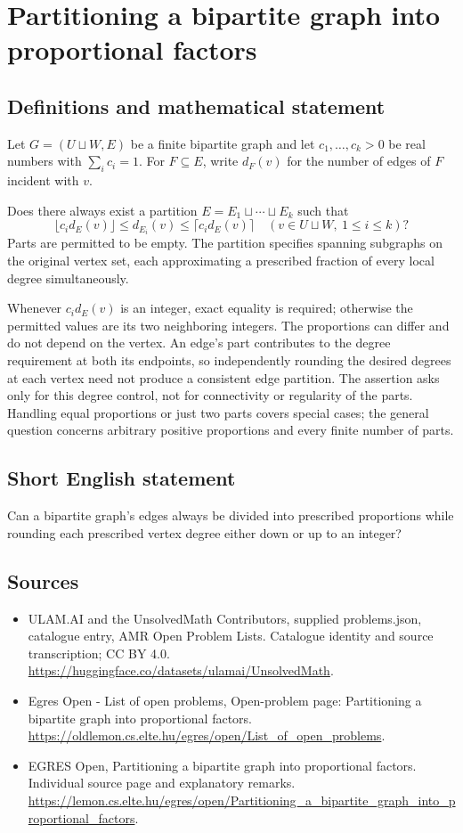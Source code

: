 \documentclass[11pt,a4paper]{article}
\begin{document}
\section*{Partitioning a bipartite graph into proportional factors}\label{statement}

\subsection{Definitions and mathematical statement}
Let $G=(U\sqcup W,E)$ be a finite bipartite graph and let
$c_1,\ldots,c_k>0$ be real numbers with $\sum_i c_i=1$.
For $F\subseteq E$, write $d_F(v)$ for the number of edges of $F$
incident with $v$.

Does there always exist a partition $E=E_1\sqcup\cdots\sqcup E_k$
such that
\[
                 \lfloor c_i d_E(v)\rfloor\le d_{E_i}(v)
                       \le\lceil c_i d_E(v)\rceil
                              \quad(v\in U\sqcup W,\ 1\le i\le k)?
\]
Parts are permitted to be empty. The partition specifies spanning
subgraphs on the original vertex set, each approximating a prescribed
fraction of every local degree simultaneously.

Whenever $c_i d_E(v)$ is an integer, exact equality is required;
otherwise the permitted values are its two neighboring integers.
The proportions can differ and do not depend on the vertex.
An edge's part contributes to the degree requirement at both its
endpoints, so independently rounding the desired degrees at each
vertex need not produce a consistent edge partition.
The assertion asks only for this degree control, not for connectivity
or regularity of the parts. Handling equal proportions or just two
parts covers special cases; the general question concerns arbitrary
positive proportions and every finite number of parts.
\subsection{Short English statement}
Can a bipartite graph's edges always be divided into prescribed
proportions while rounding each prescribed vertex degree either down or up to an integer?
\subsection{Sources}
\begin{itemize}
\item[S1] ULAM.AI and the UnsolvedMath Contributors, supplied problems.json, catalogue entry, AMR Open Problem Lists. Catalogue identity and source transcription; CC BY 4.0.
\url{https://huggingface.co/datasets/ulamai/UnsolvedMath}.
\item[S2] Egres Open - List of open problems, Open-problem page: Partitioning a bipartite graph into proportional factors. 
\url{https://oldlemon.cs.elte.hu/egres/open/List_of_open_problems}.
\item[S3] EGRES Open, Partitioning a bipartite graph into proportional factors. Individual source page and explanatory remarks.
\url{https://lemon.cs.elte.hu/egres/open/Partitioning_a_bipartite_graph_into_proportional_factors}.
\end{itemize}
\end{document}
